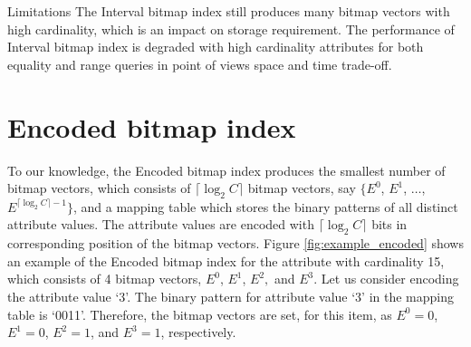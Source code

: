 \documentclass[../main/thesis.tex]{subfiles}
\begin{document}
\begin{prosNcons}{Limitations}
	The Interval bitmap index still produces many bitmap vectors with high cardinality, which is an impact on storage requirement. The performance of Interval bitmap index is degraded with high cardinality attributes for both equality and range queries in point of views space and time trade-off.
\end{prosNcons}

\section{Encoded bitmap index}
To our knowledge, the Encoded bitmap index \cite{EncodedBI} produces the smallest number of bitmap vectors, which consists of $\lceil\log_2 C\rceil$ bitmap vectors, say $\{E^0$, $E^1$, $\dots$, $E^{\lceil\log_2 C\rceil -1}\}$, and a mapping table which stores the binary patterns of all distinct attribute values. The attribute values are encoded with $\lceil\log_2 C\rceil$ bits in corresponding position of the bitmap vectors. Figure \ref{fig:example_encoded} shows an example of the Encoded bitmap index for the attribute with cardinality 15, which consists of 4 bitmap vectors, $E^0$, $E^1$, $E^2,$ and $E^3$. Let us consider encoding the attribute value `3'. The binary pattern for attribute value `3' in the mapping table is `0011'. Therefore, the bitmap vectors are set, for this item, as $E^0 = 0$, $E^1 = 0$, $E^2 = 1$, and $E^3 = 1$, respectively.

\begin{figure*}[!t]
	\centering
	\hfil
	\caption{An example of the Encoded bitmap index: encoding of attribute $A$ with $C=15$.}
	\label{fig:example_encoded}
\end{figure*}
\end{document}

